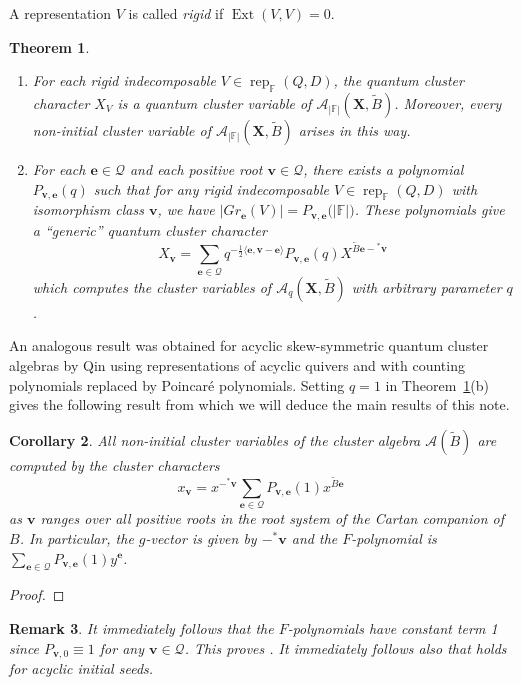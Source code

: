 \documentclass{amsart}
\newtheorem{theorem}{Theorem}
\newtheorem{corollary}[theorem]{Corollary}
\newtheorem{remark}[theorem]{Remark}
\newcommand{\bfe}{\mathbf{e}}
\newcommand{\bfv}{\mathbf{v}}
\newcommand{\bfX}{\mathbf{X}}
\newcommand{\cA}{\mathcal{A}}
\newcommand{\cQ}{\mathcal{Q}}
\newcommand{\FF}{\mathbb{F}}
\newcommand{\Ext}{\operatorname{Ext}}
\newcommand{\half}{{\frac{1}{2}}}
\newcommand{\rep}{\operatorname{rep}}
\newenvironment{enumeratea}{\begin{enumerate}[\upshape (a)]}{\end{enumerate}}
\begin{document}
  A representation $V$ is called \emph{rigid} if $\Ext(V,V)=0$.  
  \begin{theorem}\cite{rupel2}
    \label{th:quantum cluster characters}\mbox{}
    \begin{enumeratea}
      \item For each rigid indecomposable $V\in\rep_\FF(Q,D)$, the quantum cluster character $X_V$ is a quantum cluster variable of $\cA_{|\FF|}(\bfX,\tilde B)$.  
      Moreover, every non-initial cluster variable of $\cA_{|\FF|}(\bfX,\tilde B)$ arises in this way.
      \item For each $\bfe\in\cQ$ and each positive root $\bfv\in\cQ$, there exists a polynomial $P_{\bfv,\bfe}(q)$ such that for any rigid indecomposable $V\in\rep_\FF(Q,D)$ with isomorphism class $\bfv$, we have $\big|Gr_\bfe(V)\big|=P_{\bfv,\bfe}\big(|\FF|\big)$.  These polynomials give a ``generic'' quantum cluster character 
      \[X_\bfv=\sum\limits_{\bfe\in\cQ} q^{-\half\langle\bfe,\bfv-\bfe\rangle}P_{\bfv,\bfe}(q)X^{\tilde B\bfe-{}^*\bfv}\]
      which computes the cluster variables of $\cA_q(\bfX,\tilde B)$ with arbitrary parameter $q$.
    \end{enumeratea}
  \end{theorem}
  An analogous result was obtained for acyclic skew-symmetric quantum cluster algebras by Qin \cite{qin} using representations of acyclic quivers and with counting polynomials replaced by Poincar\'e polynomials.  Setting $q=1$ in Theorem~\ref{th:quantum cluster characters}(b) gives the following result from which we will deduce the main results of this note.
  \begin{corollary}
    \label{cor:classical cluster characters}
    All non-initial cluster variables of the cluster algebra $\cA(\tilde B)$ are computed by the cluster characters
    \[x_\bfv=x^{-{}^*\bfv}\sum\limits_{\bfe\in\cQ} P_{\bfv,\bfe}(1)x^{\tilde B\bfe}\]
    as $\bfv$ ranges over all positive roots in the root system of the Cartan companion of $B$.
    In particular, the $g$-vector is given by $-{}^*\bfv$ and the $F$-polynomial is $\sum\limits_{\bfe\in\cQ} P_{\bfv,\bfe}(1)y^\bfe$.
  \end{corollary}
  \begin{proof}
  \end{proof}
  \begin{remark}
    It immediately follows that the $F$-polynomials have constant term 1 since $P_{\bfv,0}\equiv1$ for any $\bfv\in\cQ$.
    This proves \cite[Conj. 5.4]{fomin-zelevinsky4}.
    It immediately follows also that \cite[Conj. 5.5]{fomin-zelevinsky4} holds for acyclic initial seeds.
  \end{remark}
\end{document}
